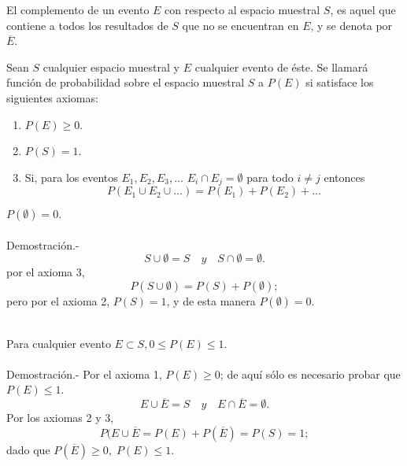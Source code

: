 \begin{tcolorbox}[colframe = white]
    \begin{def.} El complemento de un evento $E$ con respecto al espacio muestral $S$, es aquel que contiene a todos los resultados de $S$ que no se encuentran en $E$, y se denota por $\overline{E}$.
    \end{def.}
\end{tcolorbox}

\begin{tcolorbox}[colframe = white]
    \begin{def.} Sean $S$ cualquier espacio muestral y $E$ cualquier evento de éste. Se llamará función de probabilidad sobre el espacio muestral $S$ a $P(E)$ si satisface los siguientes axiomas:
	\begin{enumerate}[\bfseries 1.]
	    \item $P(E) \geq 0$.
	    \item $P(S) = 1$.
	    \item Si, para los eventos $E_1, E_2, E_3,\ldots$ $E_i \cap E_j = \emptyset$ para todo $i\neq j$ entonces $$P(E_1\cup E_2 \cup \ldots) = P(E_1) + P(E_2) + \ldots$$
	\end{enumerate}
    \end{def.}
\end{tcolorbox}

\begin{teo} $P(\emptyset) = 0.$\\\\
    Demostración.-\; $$S\cup \emptyset = S \quad y \quad S \cap \emptyset = \emptyset.$$
    por el axioma 3, $$P(S\cup \emptyset) = P(S) + P(\emptyset);$$
    pero por el axioma 2, $P(S) = 1$, y de esta manera $P(\emptyset) = 0$.\\\\
\end{teo}

\begin{teo} Para cualquier evento $E \subset S, 0 \leq P(E) \leq 1$.\\\\
    Demostración.-\; Por el axioma 1, $P(E) \geq 0$; de aquí sólo es necesario probar que $P(E) \leq 1$.
    $$E \cup \overline{E} = S \quad y \quad E\cap \overline{E} = \emptyset.$$
    Por los axiomas 2 y 3, $$P(E\cup \overline{E} = P(E) + P(\overline{E}) = P(S) = 1;$$
    dado que $P(\overline{E}) \geq 0, \; P(E) \leq 1$.\\\\
\end{teo}

